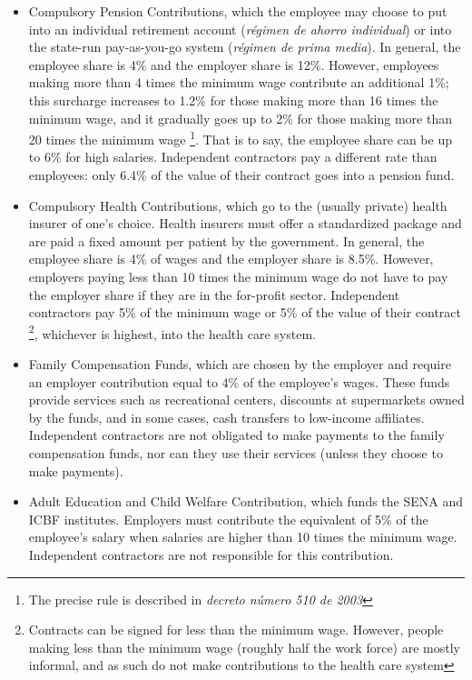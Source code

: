 \documentclass[12pt]{article}
\begin{document}
\begin{appendices}
\begin{itemize}
\item Compulsory Pension Contributions,
  which the employee may choose to put into an individual retirement account
  (\textit{r\'{e}gimen de ahorro individual})
  or into the state-run pay-as-you-go system
  (\textit{r\'{e}gimen de prima media}).
  In general, the employee share is 4\% and the employer share is 12\%.
  However, employees making more than 4 times the minimum wage
  contribute an additional 1\%; this surcharge increases to 1.2\%
  for those making more than 16 times the minimum wage,
  and it gradually goes up to 2\%
  for those making more than 20 times the minimum wage
  \footnote
      {The precise rule is described in
        \textit{decreto n\'{u}mero 510 de 2003}}.
  That is to say, the employee share can be up to 6\% for high salaries.
  Independent contractors pay a different rate than employees:
  only 6.4\% of the value of their contract goes into a pension fund.

\item Compulsory Health Contributions,
  which go to the (usually private) health insurer of one's choice.
  Health insurers must offer a standardized package
  and are paid a fixed amount per patient by the government.
  In general, the employee share is 4\% of wages
  and the employer share is 8.5\%.
  However, employers paying less than 10 times the minimum wage
  do not have to pay the employer share if they are in the for-profit sector.
  Independent contractors pay 5\% of the minimum wage
  or 5\% of the value of their contract
  \footnote{
  Contracts can be signed for less than the minimum wage.
  However, people making less than the minimum wage
  (roughly half the work force) are mostly informal,
  and as such do not make contributions to the health care system},
  whichever is highest, into the health care system.

\item Family Compensation Funds,
  which are chosen by the employer
  and require an employer contribution equal to 4\% of the employee's wages.
  These funds provide services such as recreational centers,
  discounts at supermarkets owned by the funds,
  and in some cases, cash transfers to low-income affiliates.
  Independent contractors are not obligated
  to make payments to the family compensation funds,
  nor can they use their services
  (unless they choose to make payments).

\item Adult Education and Child Welfare Contribution,
  which funds the SENA and ICBF institutes.
  Employers must contribute the equivalent of
  5\% of the employee's salary
  when salaries are higher than 10 times the minimum wage.
  Independent contractors are not responsible for this contribution.


\end{itemize}
\end{appendices}
\end{document}
